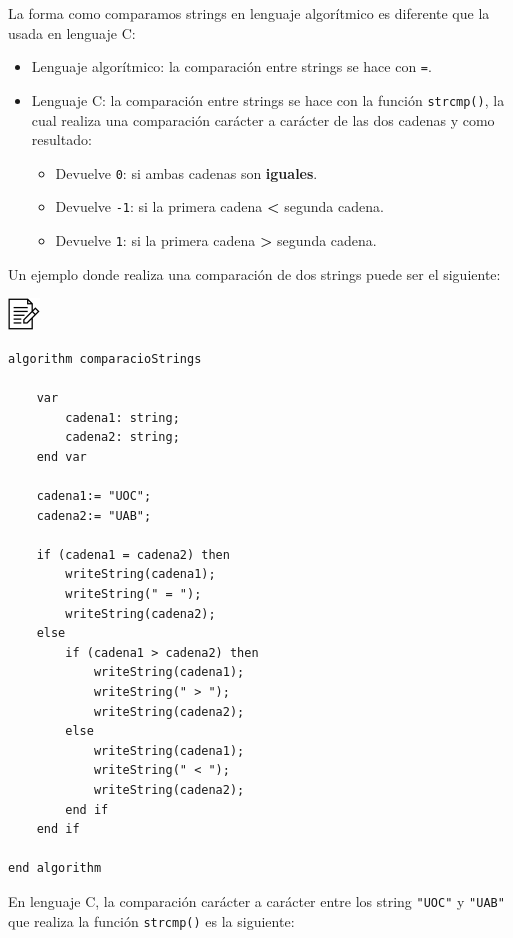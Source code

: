 \documentclass[
]{book}
\providecommand{\tightlist}{%
  \setlength{\itemsep}{0pt}\setlength{\parskip}{0pt}}
\begin{document}
La forma como comparamos strings en lenguaje algorítmico es diferente que la usada en lenguaje C:

\begin{itemize}
\tightlist
\item
  Lenguaje algorítmico: la comparación entre strings se hace con \texttt{=}.
\item
  Lenguaje C: la comparación entre strings se hace con la función \texttt{strcmp()}, la cual realiza una comparación carácter a carácter de las dos cadenas y como resultado:

  \begin{itemize}
  \tightlist
  \item
    Devuelve \texttt{0}: si ambas cadenas son \textbf{iguales}.
  \item
    Devuelve \texttt{-1}: si la primera cadena \textbf{\textless{}} segunda cadena.
  \item
    Devuelve \texttt{1}: si la primera cadena \textbf{\textgreater{}} segunda cadena.
  \end{itemize}
\end{itemize}

Un ejemplo donde realiza una comparación de dos strings puede ser el siguiente:

\includegraphics{./img/alg.png}

\begin{verbatim}
algorithm comparacioStrings

    var
        cadena1: string;
        cadena2: string;
    end var

    cadena1:= "UOC";
    cadena2:= "UAB";

    if (cadena1 = cadena2) then
        writeString(cadena1);
        writeString(" = ");
        writeString(cadena2);
    else
        if (cadena1 > cadena2) then
            writeString(cadena1);
            writeString(" > ");
            writeString(cadena2);
        else
            writeString(cadena1);
            writeString(" < ");
            writeString(cadena2);
        end if
    end if

end algorithm
\end{verbatim}

En lenguaje C, la comparación carácter a carácter entre los string \texttt{"UOC"} y \texttt{"UAB"} que realiza la función \texttt{strcmp()} es la siguiente:
\end{document}
